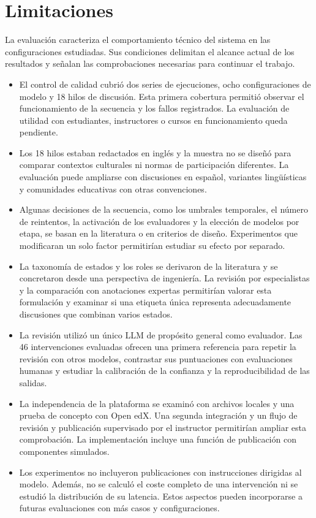 \section{Limitaciones}

La evaluación caracteriza el comportamiento técnico del sistema en las configuraciones estudiadas. Sus condiciones delimitan el alcance actual de los resultados y señalan las comprobaciones necesarias para continuar el trabajo.

\begin{itemize}
	\item El control de calidad cubrió dos series de ejecuciones, ocho configuraciones de modelo y 18 hilos de discusión. Esta primera cobertura permitió observar el funcionamiento de la secuencia y los fallos registrados. La evaluación de utilidad con estudiantes, instructores o cursos en funcionamiento queda pendiente.
	\item Los 18 hilos estaban redactados en inglés y la muestra no se diseñó para comparar contextos culturales ni normas de participación diferentes. La evaluación puede ampliarse con discusiones en español, variantes lingüísticas y comunidades educativas con otras convenciones.
	\item Algunas decisiones de la secuencia, como los umbrales temporales, el número de reintentos, la activación de los evaluadores y la elección de modelos por etapa, se basan en la literatura o en criterios de diseño. Experimentos que modificaran un solo factor permitirían estudiar su efecto por separado.
	\item La taxonomía de estados y los roles se derivaron de la literatura y se concretaron desde una perspectiva de ingeniería. La revisión por especialistas y la comparación con anotaciones expertas permitirían valorar esta formulación y examinar si una etiqueta única representa adecuadamente discusiones que combinan varios estados.
	\item La revisión utilizó un único LLM de propósito general como evaluador. Las 46 intervenciones evaluadas ofrecen una primera referencia para repetir la revisión con otros modelos, contrastar sus puntuaciones con evaluaciones humanas y estudiar la calibración de la confianza y la reproducibilidad de las salidas.
\item La independencia de la plataforma se examinó con archivos locales y una prueba de concepto con Open edX. Una segunda integración y un flujo de revisión y publicación supervisado por el instructor permitirían ampliar esta comprobación. La implementación incluye una función de publicación con componentes simulados.
	\item Los experimentos no incluyeron publicaciones con instrucciones dirigidas al modelo. Además, no se calculó el coste completo de una intervención ni se estudió la distribución de su latencia. Estos aspectos pueden incorporarse a futuras evaluaciones con más casos y configuraciones.
\end{itemize}

